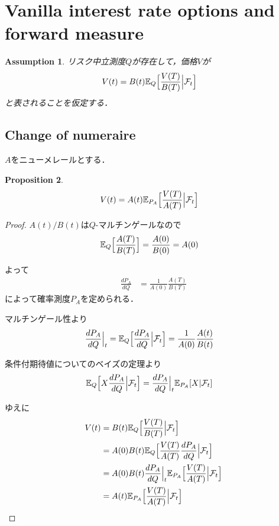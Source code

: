 \documentclass[11pt, a4paper]{jsarticle}
\newcommand{\E}{\mathbb{E}}
\newtheorem{assumption}{Assumption}[section]
\newtheorem{proposition}[assumption]{Proposition}
\begin{document}
\setcounter{section}{1}
\section{Vanilla interest rate options and forward measure}
\begin{assumption}
リスク中立測度$Q$が存在して，価格$V$が
\begin{align}
V(t)
& =
B(t) \E_Q \Bigl[ \frac{V(T)}{B(T)} \Bigl| \mathcal{F}_t \Bigr] \nonumber
\end{align}
と表されることを仮定する．
\end{assumption}

\subsection{Change of numeraire}
$A$をニューメレールとする．

\begin{proposition}
\begin{align}
V(t)
& =
A(t) \E_{P_A} \Bigl[ \frac{V(T)}{A(T)} \Bigl| \mathcal{F}_t \Bigr] \nonumber
\end{align}
\end{proposition}

\begin{proof}
$A(t) / B(t)$は$Q$-マルチンゲールなので
\begin{align}
\E_Q \Bigl[ \frac{A(T)}{B(T)} \Bigr]
& =
\frac{A(0)}{B(0)} = A(0) \nonumber
\end{align}

よって
\begin{align}
\frac{d P_A}{d Q}
& =
\frac{1}{A(0)} \frac{A(T)}{B(T)} \nonumber
\end{align}
によって確率測度$P_A$を定められる．

マルチンゲール性より
\begin{align}
\frac{d P_A}{d Q} \Bigr|_t
& =
\E_Q \Bigl[ \frac{d P_A}{d Q} \Big| \mathcal{F}_t \Bigr]
= \frac{1}{A(0)} \frac{A(t)}{B(t)} \nonumber
\end{align}

条件付期待値についてのベイズの定理より
\begin{align}
\E_Q \Bigl[ X \frac{d P_A}{d Q} \Bigl| \mathcal{F}_t \Bigr]
& =
\frac{d P_A}{d Q} \Bigr|_t \E_{P_A} [X | \mathcal{F}_t] \nonumber
\end{align}

ゆえに
\begin{align}
V(t)
& =
B(t) \E_Q \Bigl[ \frac{V(T)}{B(T)} \Bigl| \mathcal{F}_t \Bigr] \nonumber \\
& =
A(0) B(t) \E_Q \Bigl[ \frac{V(T)}{A(T)} \frac{d P_A}{d Q} \Bigl| \mathcal{F}_t \Bigr] \nonumber \\
& =
A(0) B(t) \frac{d P_A}{d Q} \Bigr|_t \E_{P_A} \Bigl[ \frac{V(T)}{A(T)} \Bigl| \mathcal{F}_t \Bigr] \nonumber \\
& =
A(t) \E_{P_A} \Bigl[ \frac{V(T)}{A(T)} \Bigl| \mathcal{F}_t \Bigr] \nonumber
\end{align}
\end{proof}
\end{document}
